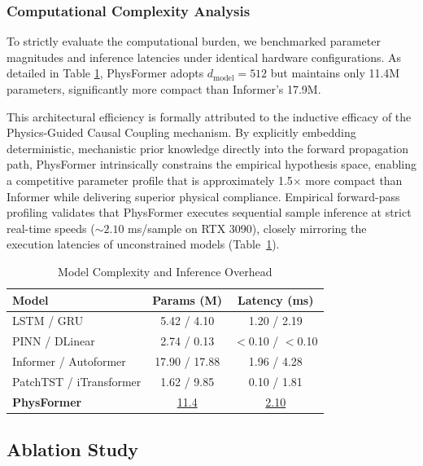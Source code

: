 \subsubsection{Computational Complexity Analysis}
\label{subsubsec:overhead}

To strictly evaluate the computational burden, we benchmarked parameter magnitudes and inference latencies under identical hardware configurations. As detailed in Table \ref{tab:overhead}, PhysFormer adopts $d_\text{model}=512$ but maintains only 11.4M parameters, significantly more compact than Informer's 17.9M.

This architectural efficiency is formally attributed to the inductive efficacy of the Physics-Guided Causal Coupling mechanism. By explicitly embedding deterministic, mechanistic prior knowledge directly into the forward propagation path, PhysFormer intrinsically constrains the empirical hypothesis space, enabling a competitive parameter profile that is approximately 1.5$\times$ more compact than Informer while delivering superior physical compliance. Empirical forward-pass profiling validates that PhysFormer executes sequential sample inference at strict real-time speeds ($\sim \text{2.10}$ ms/sample on RTX 3090), closely mirroring the execution latencies of unconstrained models (Table~\ref{tab:overhead}).

\begin{table}[htbp]
\centering
\caption{Model Complexity and Inference Overhead}
\label{tab:overhead}
\footnotesize
\setlength{\tabcolsep}{2pt}
\begin{tabular*}{\columnwidth}{@{\extracolsep{\fill}}lcc@{}}
\toprule
Model & Params (M) & Latency (ms) \\
\midrule
LSTM / GRU & 5.42 / 4.10 & 1.20 / 2.19 \\
PINN / DLinear & 2.74 / 0.13 & $<$0.10 / $<$0.10 \\
Informer / Autoformer & 17.90 / 17.88 & 1.96 / 4.28 \\
PatchTST / iTransformer & 1.62 / 9.85 & 0.10 / 1.81 \\
\textbf{PhysFormer} & \underline{11.4} & \underline{2.10} \\
\bottomrule
\end{tabular*}
\end{table}

\subsection{Ablation Study}
\label{subsec:ablation}

